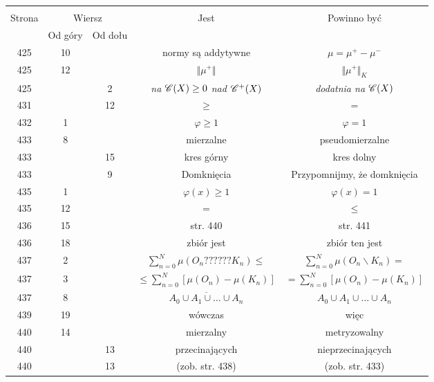 \documentclass[a4paper,11pt]{article}
\begin{document}
\begin{center}

  \begin{tabular}{|c|c|c|c|c|}
    \hline
    & \multicolumn{2}{c|}{} & & \\
    Strona & \multicolumn{2}{c|}{Wiersz} & Jest
                              & Powinno być \\ \cline{2-3}
    & Od góry & Od dołu & & \\
    \hline
    425 & 10 & & normy są addytywne & $\mu = \mu^{ + } - \mu^{ - }$ \\
    425 & 12 & & $\Vert \mu^{ + } \Vert$ & $\Vert \mu^{ + } \Vert_{ K }$ \\
    425 & &  2 & \textit{na $\mathcal{C}( X ) \geq 0$ nad $\mathcal{C}^{ + }( X )$}
           & \textit{dodatnia na $\mathcal{C}( X )$} \\
    431 & & 12 & $\geq$ & $=$ \\
    432 &  1 & & $\varphi \geq 1$ & $\varphi = 1$ \\
    433 &  8 & & mierzalne & pseudomierzalne \\
    433 & & 15 & kres górny & kres dolny \\
    433 & &  9 & Domknięcia & Przypomnijmy, że domknięcia \\
    435 &  1 & & $\varphi( x ) \geq 1$ & $\varphi( x ) = 1$ \\
    435 & 12 & & $=$ & $\leq$ \\
    436 & 15 & & str. 440 & str. 441 \\
    436 & 18 & & zbiór jest & zbiór ten jest \\
    437 &  2 & & $\sum\limits^{ N }_{ n = 0 } \mu( O_{ n } ??????
                 K_{ n } ) \leq$
           & $\sum\limits^{ N }_{ n = 0 } \mu( O_{ n } \backslash K_{ n } ) =$ \\
    437 &  3 & & $\leq \sum\limits^{ N }_{ n = 0 } [ \mu( O_{ n } )
                 - \mu( K_{ n } ) ]$
           & $= \sum\limits^{ N }_{ n = 0 } [ \mu( O_{ n } )
             - \mu( K_{ n } ) ]$ \\
    437 &  8 & & $\overline{ A_{ 0 } \cup A_{ 1 } \cup \ldots \cup A_{ n } }$
           & $A_{ 0 } \cup A_{ 1 } \cup \ldots \cup A_{ n }$ \\
    439 & 19 & & wówczas & więc \\
    440 & 14 & & mierzalny & metryzowalny \\
    440 & & 13 & przecinających & nieprzecinających \\
    440 & & 13 & (zob. str. 438) & (zob. str. 433) \\

\end{tabular}
\end{center}
\end{document}
